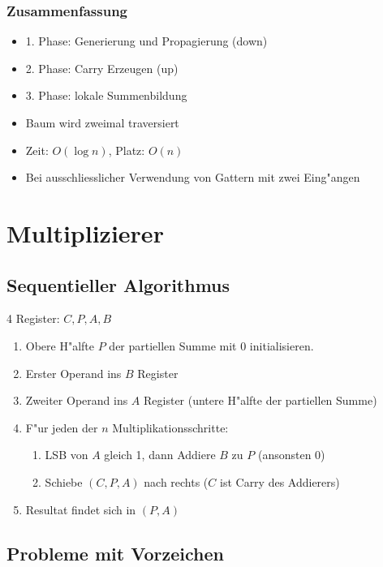 \documentclass[german, 10pt, a4paper, twocolumn]{scrartcl}
\theoremstyle{definition}
\begin{document}

\subsubsection{Zusammenfassung}

\begin{itemize}
	\item 1. Phase: Generierung und Propagierung (down)
	\item 2. Phase: Carry Erzeugen (up)
	\item 3. Phase: lokale Summenbildung
	\item Baum wird zweimal traversiert
	\item Zeit: $O(\log n)$, Platz: $O(n)$
	\item Bei ausschliesslicher Verwendung von Gattern mit zwei Eing"angen
\end{itemize}

\section{Multiplizierer}

\subsection{Sequentieller Algorithmus}

4 Register: $C, P, A, B$

\begin{enumerate}
	\item Obere H"alfte $P$ der partiellen Summe mit 0 initialisieren.
	\item Erster Operand ins $B$ Register
	\item Zweiter Operand ins $A$ Register (untere H"alfte der partiellen Summe)
	\item F"ur jeden der $n$ Multiplikationsschritte:
		\begin{enumerate}
			\item LSB von $A$ gleich 1, dann Addiere $B$ zu $P$ (ansonsten 0)
			\item Schiebe $(C,P,A)$ nach rechts ($C$ ist Carry des Addierers)
		\end{enumerate}
	\item Resultat findet sich in $(P,A)$
\end{enumerate}

\subsection{Probleme mit Vorzeichen}
\end{document}
